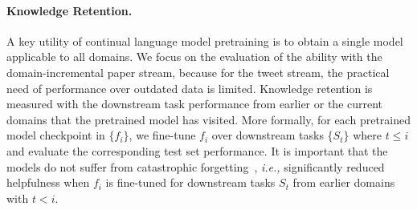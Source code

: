 
\paragraph{Knowledge Retention.} 
A key utility of continual language model pretraining is to obtain a single model applicable to all domains. We focus on the evaluation of the ability with the domain-incremental paper stream, because for the tweet stream, the practical need of performance over outdated data is limited. Knowledge retention is measured with the downstream task performance from earlier or the current domains that the pretrained model has visited. More formally, for each pretrained model checkpoint in $\{f_i\}$, we fine-tune $f_i$ over downstream tasks $\{S_t\}$ where $t\leq i$ and evaluate the corresponding test set performance. It is important that the models do not suffer from catastrophic forgetting~\cite{Robins1995CatastrophicFR}, \textit{i.e.,} significantly reduced helpfulness when $f_i$ is fine-tuned for downstream tasks $S_t$ from earlier domains with $t<i$. 




